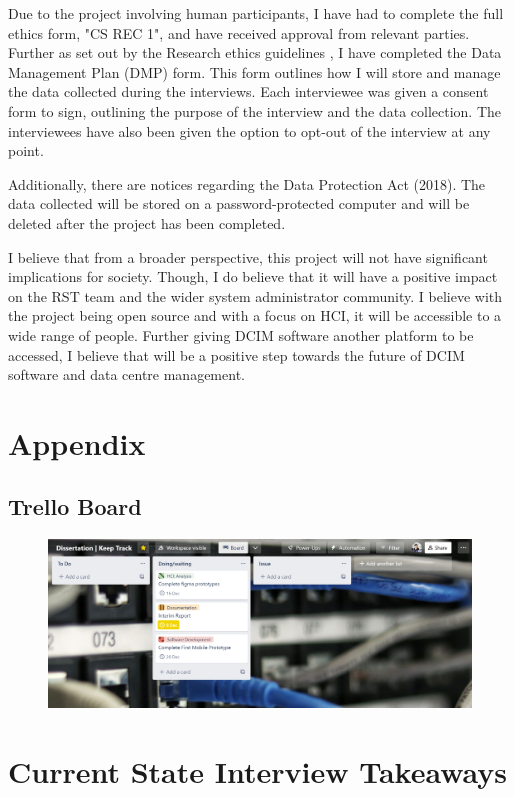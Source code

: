 \documentclass [11pt,a4paper]{article}
\begin{document}
Due to the project involving human participants, I have had to complete the full ethics form, "CS REC 1", and have received approval from relevant parties. Further as set out by the Research ethics guidelines \cite{ethicsguidelines}, I have completed the Data Management Plan (DMP) form. This form outlines how I will store and manage the data collected during the interviews. Each interviewee was given a consent form to sign, outlining the purpose of the interview and the data collection. The interviewees have also been given the option to opt-out of the interview at any point.

Additionally, there are notices regarding the Data Protection Act (2018). The  data collected will be stored on a password-protected computer and will be deleted after the project has been completed.

I believe that from a broader perspective, this project will not have significant implications for society. Though, I do believe that it will have a positive impact on the RST team and the wider system administrator community. I believe with the project being open source and with a focus on HCI, it will be accessible to a wide range of people. Further giving DCIM software another platform to be accessed, I believe that will be a positive step towards the future of DCIM software and data centre management.
\pagebreak


 

\pagebreak
{}
\appendix
\section{Appendix}
\label{sec:appendix}
\subsection{Trello Board}
\label{sec:trello_board}
\begin{figure}[H]
    \centering
    \includegraphics[width=1\textwidth]{images/trello-board.png}
\end{figure}   

\section{Current State Interview Takeaways}
\label{sec:current_state_interview_takeaways}


\end{document}

